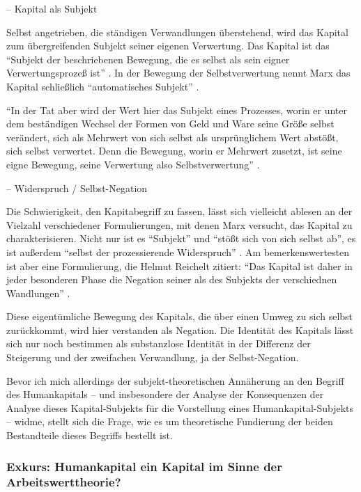 \documentclass[12pt,
               DIV13,
               paper=a4,
               twoside=false,
               onehalfspacing,
               bibliography=totoc,
               toc=graduated,
               draft,
               ]{scrartcl}
\newcommand{\pc}[2]{\parencite[#1]{#2}}
\newcommand{\zn}[3]{\parencite[#1, zit. nach][#2]{#3}}
\begin{document}
-- Kapital als Subjekt

Selbst angetrieben, die ständigen Verwandlungen überstehend, wird das
Kapital zum übergreifenden Subjekt seiner eigenen Verwertung. Das
Kapital ist das "`Subjekt der beschriebenen Bewegung, die es selbst
als sein eigner Verwertungsprozeß ist"' \zn{Marx}{181}{reichelt}. In
der Bewegung der Selbstverwertung nennt Marx das Kapital schließlich
"`automatisches Subjekt"' \pc{169}{kap}.

"`In der Tat aber wird der Wert hier das Subjekt eines Prozesses,
worin er unter dem beständigen Wechsel der Formen von Geld und Ware
seine Größe selbst verändert, sich als Mehrwert von sich selbst als
ursprünglichem Wert abstößt, sich selbst verwertet. Denn die Bewegung,
worin er Mehrwert zusetzt, ist seine eigne Bewegung, seine Verwertung
also Selbstverwertung"' \pc{169}{kap}.

-- Widerspruch / Selbst-Negation

Die Schwierigkeit, den Kapitabegriff zu fassen, lässt sich vielleicht
ablesen an der Vielzahl verschiedener Formulierungen, mit denen Marx
versucht, das Kapital zu charakterisieren. Nicht nur ist es
"`Subjekt"' und "`stößt sich von sich selbst ab"', es ist außerdem
"`selbst der prozessierende Widerspruch"' \pc{601}{grundr}. Am
bemerkenswertesten ist aber eine Formulierung, die Helmut Reichelt
zitiert: "`Das Kapital ist daher in jeder besonderen Phase die
Negation seiner als des Subjekts der verschiednen Wandlungen"'
\zn{Marx}{181}{reichelt}.

Diese eigentümliche Bewegung des Kapitals, die über einen Umweg zu
sich selbst zurückkommt, wird hier verstanden als Negation. Die
Identität des Kapitals lässt sich nur noch bestimmen als substanzlose
Identität in der Differenz der Steigerung und der zweifachen
Verwandlung, ja der Selbst-Negation.


Bevor ich mich allerdings der subjekt-theoretischen Annäherung an den
Begriff des Humankapitals -- und insbesondere der Analyse der
Konsequenzen der Analyse dieses Kapital-Subjekts für die Vorstellung
eines Humankapital-Subjekts -- widme, stellt sich die Frage, wie es um
theoretische Fundierung der beiden Bestandteile dieses Begriffs
bestellt ist.

\subsubsection{Exkurs: Humankapital ein Kapital im Sinne der
Arbeitswerttheorie?}
\end{document}
